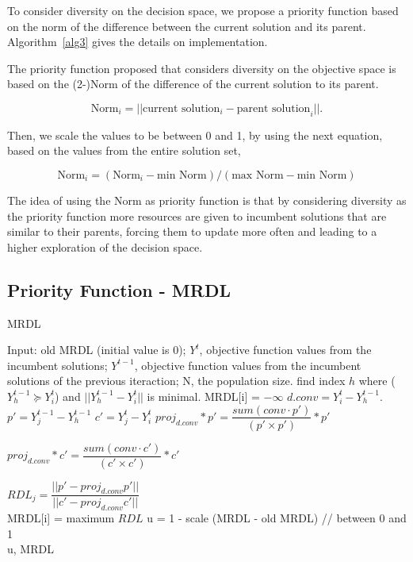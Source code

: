 To consider diversity on the decision space, we propose a priority function based on the norm of the difference between the current solution and its parent. Algorithm~\ref{alg3} gives the details on implementation.

The priority function proposed that considers diversity on the objective space is based on the (2-)Norm of the difference of the current solution to its parent.

\begin{equation}
 \text{Norm}_i = ||\text{current solution}_i - \text{parent solution}_i||.
\end{equation}

Then, we scale the values to be between 0 and 1, by using the next equation, based on the values from the entire solution set,

\begin{equation}\label{scaling}
 \text{Norm}_i = (\text{Norm}_i - \text{min  Norm}) / (\text{max Norm} - \text{min Norm})
\end{equation}

The idea of using the Norm as priority function is that by considering diversity as the priority function more resources are given to incumbent solutions that are similar to their parents, forcing them to update more often and leading to a higher exploration of the decision space.


\subsection{Priority Function - MRDL} 


\begin{algorithm}[t]
	\caption{MRDL}\label{alg2}
	\begin{algorithmic}[1]
		
		\State Input: old MRDL (initial value is 0); $Y^t$, objective function values from the incumbent solutions; $Y^{t-1}$, objective function values from the incumbent solutions of the previous iteraction; N, the population size.		
		\State find index $h$ where  ($Y^{t-1}_h \succeq Y^t_i$) and $||Y^{t-1}_h - Y^t_i  ||$ is minimal.
		\State MRDL[i] = $-\infty$
		\Else
		\State $d.conv = Y^t_i - Y^{t-1}_h$.
		\State $p \prime = Y^{t-1}_j - Y^{t-1}_h$
		\State $c \prime = Y^t_j - Y^t_i$
		\State $proj_{d.conv}*p \prime = \dfrac{sum(conv \cdot p \prime)}{(p \prime \times p \prime)}*p \prime$
		
		\State $ proj_{d.conv}*c \prime = \dfrac{sum(conv \cdot c \prime)}{(c \prime \times c \prime)}*c \prime$
		
		\State $RDL_j = \dfrac{ ||p \prime - proj_{d.conv}p \prime|| }{||c \prime - proj_{d.conv}c \prime||}$\\
		
		\EndFor
		MRDL[i] = maximum $RDL$
		\EndIf
		\EndFor
		\State u = 1 - scale (MRDL - old MRDL) // between 0 and 1\\
	\Return u, MRDL
	\end{algorithmic}
\end{algorithm}

